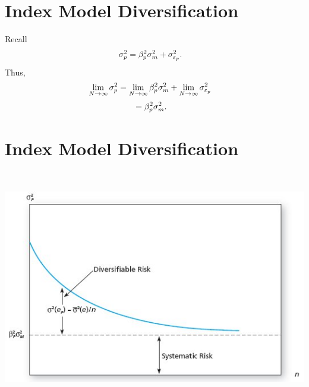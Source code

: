 \documentclass[letterpaper,10pt,english]{sphinxmanual}
\begin{document}
\section{Index Model Diversification}
\label{indexModels:id11}
Recall
\begin{gather}
\begin{split}\sigma^2_p & = \beta^2_p \sigma^2_m + \sigma^2_{\varepsilon_p}.\end{split}\notag
\end{gather}
Thus,
\begin{gather}
\begin{split}\lim_{N \to \infty} \sigma^2_p & = \lim_{N \to \infty} \beta^2_p
\sigma^2_m + \lim_{N \to \infty} \sigma^2_{\varepsilon_p}\end{split}\notag
\end{gather}\begin{gather}
\begin{split}& = \beta^2_p \sigma^2_m.\end{split}\notag
\end{gather}

\section{Index Model Diversification}
\label{indexModels:id12}
$\qquad$

\includegraphics[width=6in]{pg254_1.jpg}
\end{document}
